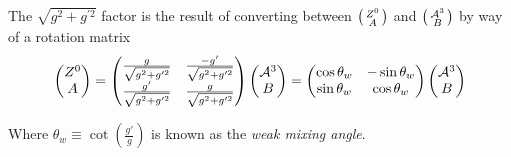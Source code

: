         The $\sqrt{g^2 + g^{\prime 2}}$ factor is the result of converting between
            $\big(\begin{smallmatrix} Z^0 \\ A \end{smallmatrix}\big)$ and $\big(\begin{smallmatrix} \mathcal{A}^3 \\ B \end{smallmatrix}\big)$ by way of a rotation matrix
        \begin{equation} \begin{split}
            \begin{pmatrix} Z^0 \\ A \end{pmatrix} =
            \begin{pmatrix}
                \frac{g}{\sqrt{g^2 + g^{\prime 2}}} & \frac{-g'}{\sqrt{g^2 + g^{\prime 2}}} \\
                \frac{g'}{\sqrt{g^2 + g^{\prime 2}}} & \frac{g}{\sqrt{g^2 + g^{\prime 2}}}
            \end{pmatrix} \begin{pmatrix} \mathcal{A}^3 \\ B \end{pmatrix} = 
            \begin{pmatrix}
                \cos\theta_w & -\sin\theta_w \\
                \sin\theta_w & \cos\theta_w
            \end{pmatrix} \begin{pmatrix} \mathcal{A}^3 \\ B \end{pmatrix}
        \end{split} \end{equation}

        Where $\theta_w \equiv \cot(\frac{g'}{g})$ is known as the \textit{weak mixing angle}.

